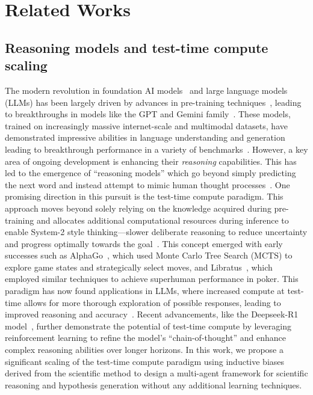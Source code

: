 \section{Related Works}
\subsection{Reasoning models and test-time compute scaling}
The modern revolution in foundation AI models~\citep{bommasani2021opportunities} and large language models (LLMs) has been largely driven by advances in pre-training techniques~\citep{erhan2010does, radford2018improving}, leading to breakthroughs in models like the GPT and Gemini family~\citep{team2023gemini, achiam2023gpt}. These models, trained on increasingly massive internet-scale and multimodal datasets, have demonstrated impressive abilities in language understanding and generation leading to breakthrough performance in a variety of benchmarks~\citep{chowdhery2022palm, google2023palm2}.  However, a key area of ongoing development is enhancing their \textit{reasoning} capabilities. This has led to the emergence of ``reasoning models'' which go beyond simply predicting the next word and instead attempt to mimic human thought processes~\citep{wei2022chain}. One promising direction in this pursuit is the test-time compute paradigm.  This approach moves beyond solely relying on the knowledge acquired during pre-training and allocates additional computational resources during inference to enable System-2 style thinking---slower deliberate reasoning to reduce uncertainty and progress optimally towards the goal~\citep{kahneman2011thinking}. This concept emerged with early successes such as AlphaGo~\citep{silver2016mastering}, which used Monte Carlo Tree Search (MCTS) to explore game states and strategically select moves, and Libratus~\citep{brown2019superhuman}, which employed similar techniques to achieve superhuman performance in poker. This paradigm has now found applications in LLMs, where increased compute at test-time allows for more thorough exploration of possible responses, leading to improved reasoning and accuracy~\citep{wei2022chain, yao2024tree, zelikman2022star, chen2024more, snell2024scaling,4928, muennighoff2025s1, tu2024towards}. Recent advancements, like the Deepseek-R1 model~\citep{guo2025deepseek}, further demonstrate the potential of test-time compute by leveraging reinforcement learning to refine the model's ``chain-of-thought'' and enhance complex reasoning abilities over longer horizons. In this work, we propose a significant scaling of the test-time compute paradigm using inductive biases derived from the scientific method to design a multi-agent framework for scientific reasoning and hypothesis generation without any additional learning techniques.

